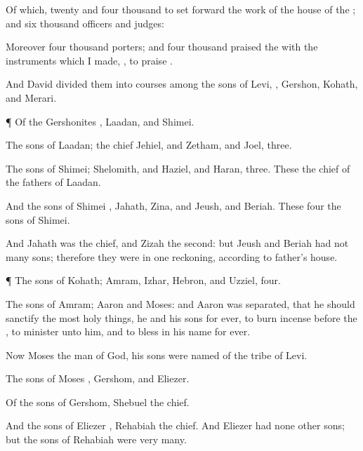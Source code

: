 {Of
which,
twenty and
four
thousand
{} to set
forward the
work of the
house of the
{}; and
six
thousand
{}
officers and
judges:

Moreover
four
thousand
{}
porters; and
four
thousand
praised the
{} with the
instruments which I
made,
{}, to
praise
{}.

And
David
divided them into
courses among the
sons of
Levi,
{},
Gershon,
Kohath, and
Merari.


\par }{\PP {}¶ Of the
Gershonites
{},
Laadan, and
Shimei.

The
sons of
Laadan; the
chief
{}
Jehiel, and
Zetham, and
Joel,
three.

The
sons of
Shimei;
Shelomith, and
Haziel, and
Haran,
three. These
{} the
chief of the
fathers of
Laadan.

And the
sons of
Shimei
{},
Jahath,
Zina, and
Jeush, and
Beriah. These
four
{} the
sons of
Shimei.

And
Jahath was the
chief, and
Zizah the
second: but
Jeush and
Beriah had not
many
sons; therefore they were in
one
reckoning, according to
{}
father’s
house.


\par }{\PP {}¶ The
sons of
Kohath;
Amram,
Izhar,
Hebron, and
Uzziel,
four.

The
sons of
Amram;
Aaron and
Moses: and
Aaron was
separated, that he should
sanctify the
most holy
things, he and his
sons
for
ever, to burn
incense
before the
{}, to
minister unto him, and to
bless in his
name
for
ever.

Now
{}
Moses the
man of
God, his
sons were
named of the
tribe of
Levi.

The
sons of
Moses
{},
Gershom, and
Eliezer.

Of the
sons of
Gershom,
Shebuel
{} the
chief.

And the
sons of
Eliezer
{},
Rehabiah the
chief. And
Eliezer had none
other
sons; but the
sons of
Rehabiah were
very
many.

}
